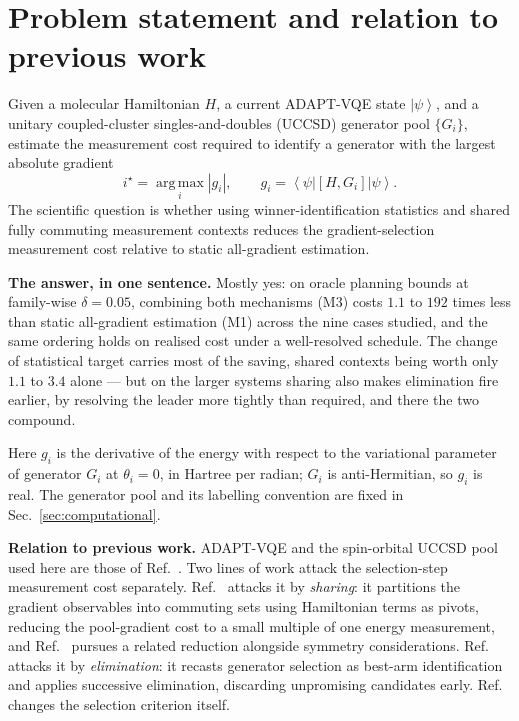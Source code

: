 \documentclass[10pt]{article}
\newcommand{\ket}[1]{\left|#1\right\rangle}
\newcommand{\bra}[1]{\left\langle#1\right|}
\newcommand{\comm}[2]{\left[#1,#2\right]}
\newcommand{\argmax}{\operatorname*{arg\,max}}
\begin{document}
\begin{abstract}
\textbf{Scope.} Every number is a single-ADAPT-step diagnostic for one fixed state, and counts shots only: circuit depth, the number of distinct measurement settings, and state-preparation cost are excluded (Sec.~\ref{sec:assumptions}). Part III symmetry filtering and tapering are not included in the Part I tables; Part III supplies a smaller input problem to the same measurement methods.
\end{abstract}

\section{Problem statement and relation to previous work}
\label{sec:problem}

Given a molecular Hamiltonian $H$, a current ADAPT-VQE state $\ket{\psi}$, and a unitary coupled-cluster singles-and-doubles (UCCSD) generator pool $\{G_i\}$, estimate the measurement cost required to identify a generator with the largest absolute gradient
\begin{equation}
  i^\star = \argmax_i |g_i|,
  \qquad
  g_i = \bra{\psi}\comm{H}{G_i}\ket{\psi} .
  \label{eq:gradient}
\end{equation}
The scientific question is whether using winner-identification statistics and shared fully commuting measurement contexts reduces the gradient-selection measurement cost relative to static all-gradient estimation.

\textbf{The answer, in one sentence.} Mostly yes: on oracle planning bounds at family-wise $\delta=0.05$, combining both mechanisms (M3) costs $1.1$ to $192$ times less than static all-gradient estimation (M1) across the nine cases studied, and the same ordering holds on realised cost under a well-resolved schedule. The change of statistical target carries most of the saving, shared contexts being worth only $1.1$ to $3.4$ alone --- but on the larger systems sharing also makes elimination fire earlier, by resolving the leader more tightly than required, and there the two compound.

Here $g_i$ is the derivative of the energy with respect to the variational parameter of generator $G_i$ at $\theta_i=0$, in Hartree per radian; $G_i$ is anti-Hermitian, so $g_i$ is real. The generator pool and its labelling convention are fixed in Sec.~\ref{sec:computational}.

\textbf{Relation to previous work.} ADAPT-VQE and the spin-orbital UCCSD pool used here are those of Ref.~\cite{Grimsley2019ADAPT}. Two lines of work attack the selection-step measurement cost separately. Ref.~\cite{Anastasiou2023ReallyMeasure} attacks it by \emph{sharing}: it partitions the gradient observables into commuting sets using Hamiltonian terms as pivots, reducing the pool-gradient cost to a small multiple of one energy measurement, and Ref.~\cite{Shkolnikov2023Avoiding} pursues a related reduction alongside symmetry considerations. Ref.~\cite{Huang2025QuantumGambling} attacks it by \emph{elimination}: it recasts generator selection as best-arm identification and applies successive elimination, discarding unpromising candidates early. Ref.~\cite{Rossi2026RSe} changes the selection criterion itself.
\end{document}
